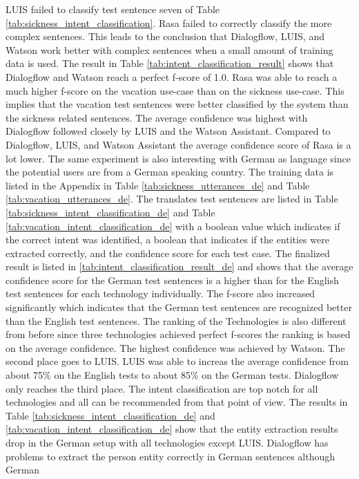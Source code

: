 LUIS failed to classify test sentence seven of Table \ref{tab:sickness_intent_classification}.
Rasa failed to correctly classify the more complex sentences.
This leads to the conclusion that Dialogflow, LUIS, and Watson work better with 
complex sentences when a small amount of training data is used.
The result in Table \ref{tab:intent_classification_result} shows that 
Dialogflow and Watson reach a perfect f-score of 1.0.
Rasa was able to reach a much higher f-score on the vacation use-case than 
on the sickness use-case.
This implies that the vacation test sentences were better classified by the system than
the sickness related sentences. 
The average confidence was highest with Dialogflow followed 
closely by LUIS and the Watson Assistant.
Compared to Dialogflow, LUIS, and Watson Assistant the average confidence
score of Rasa is a lot lower.
The same experiment is also interesting with German as language since the potential 
users are from a German speaking country.
The training data is listed in the Appendix in Table \ref{tab:sickness_utterances_de} and 
Table \ref{tab:vacation_utterances_de}.
The translates test sentences are listed in Table \ref{tab:sickness_intent_classification_de} 
and Table \ref{tab:vacation_intent_classification_de} with a boolean value which indicates if the 
correct intent was identified, a boolean that indicates if the entities were extracted correctly,
and the confidence score for each test case.
The finalized result is listed in \ref{tab:intent_classification_result_de} and shows 
that the average confidence score for the German test sentences is a higher than 
for the English test sentences for each technology individually.
The f-score also increased significantly which indicates that the German test sentences are 
recognized better than the English test sentences.
The ranking of the Technologies is also different from before since three technologies 
achieved perfect f-scores the ranking is based on the average confidence.
The highest confidence was achieved by Watson.
The second place goes to LUIS.
LUIS was able to increas the average confidence from about 75\% on the English tests 
to about 85\% on the German tests.
Dialogflow only reaches the third place.
The intent classification are top notch for all technologies and all can be recommended from that 
point of view.
The results in Table \ref{tab:sickness_intent_classification_de} and \ref{tab:vacation_intent_classification_de} 
show that the entity extraction results drop in the German setup with all technologies except LUIS.
Dialogflow has problems to extract the person entity correctly in German sentences although German 
